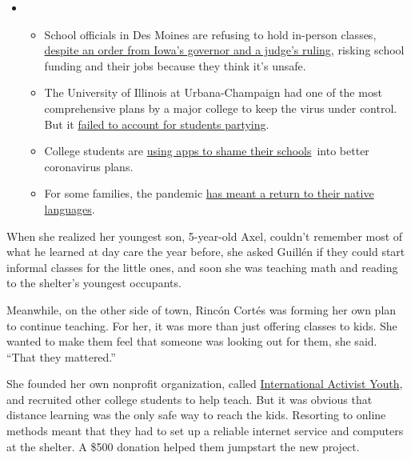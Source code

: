 \begin{itemize}
\item
  \begin{itemize}
  \tightlist
  \item
    School officials in Des Moines are refusing to hold in-person
    classes,
    \href{https://www.nytimes3xbfgragh.onion/2020/09/10/us/des-moines-school-opening-coronavirus.html?action=click\&pgtype=Article\&state=default\&region=MAIN_CONTENT_3\&context=storylines_keepup}{despite
    an order from Iowa's governor and a judge's ruling}, risking school
    funding and their jobs because they think it's unsafe.
  \item
    The University of Illinois at Urbana-Champaign had one of the most
    comprehensive plans by a major college to keep the virus under
    control. But it
    \href{https://www.nytimes3xbfgragh.onion/2020/09/10/health/university-illinois-covid.html?action=click\&pgtype=Article\&state=default\&region=MAIN_CONTENT_3\&context=storylines_keepup}{failed
    to account for students partying}.
  \item
    College students are
    \href{https://www.nytimes3xbfgragh.onion/2020/09/10/technology/coronavirus-quarantines-college.html?action=click\&pgtype=Article\&state=default\&region=MAIN_CONTENT_3\&context=storylines_keepup}{using
    apps to shame their schools}~into better coronavirus plans.
  \item
    For some families, the pandemic
    \href{https://www.nytimes3xbfgragh.onion/2020/09/10/parenting/family-second-language-coronavirus.html?action=click\&pgtype=Article\&state=default\&region=MAIN_CONTENT_3\&context=storylines_keepup}{has
    meant a return to their native languages}.
  \end{itemize}
\end{itemize}

When she realized her youngest son, 5-year-old Axel, couldn't remember
most of what he learned at day care the year before, she asked Guillén
if they could start informal classes for the little ones, and soon she
was teaching math and reading to the shelter's youngest occupants.

Meanwhile, on the other side of town, Rincón Cortés was forming her own
plan to continue teaching. For her, it was more than just offering
classes to kids. She wanted to make them feel that someone was looking
out for them, she said. ``That they mattered.''

She founded her own nonprofit organization, called
\href{https://www.internationalactivistyouth.com/}{International
Activist Youth}, and recruited other college students to help teach. But
it was obvious that distance learning was the only safe way to reach the
kids. Resorting to online methods meant that they had to set up a
reliable internet service and computers at the shelter. A \$500 donation
helped them jumpstart the new project.


